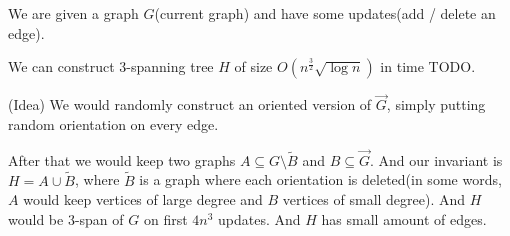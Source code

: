 \begin{thm}
	We are given a graph $G$(current graph) and have some updates(add / delete an edge).

	We can construct $3$-spanning tree $H$ of size $O\left(n^{\frac{3}{2}}\sqrt{\log n}\right)$ in time TODO.
\end{thm}

\begin{remrk} (Idea)
We would randomly construct an oriented version of $\vec G$, simply putting random orientation on every edge.

After that we would keep two graphs $A \subseteq G \setminus \tilde B$ and $B \subseteq \vec G$.
And our invariant is $H = A \cup \tilde B$, where $\tilde B$ is a graph where each orientation is deleted(in some words, $A$ would keep vertices of large degree and $B$ vertices of small degree).
And $H$ would be $3$-span of $G$ on first $4 n^3$ updates. And $H$ has small amount of edges.
\end{remrk}


